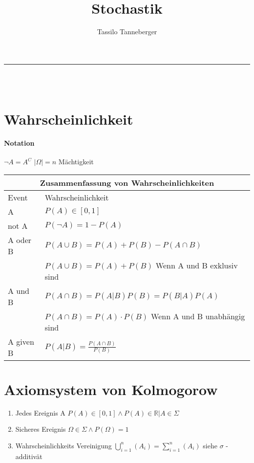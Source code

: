 \documentclass[12pt]{article}
\title{Stochastik}
\author{Tassilo Tanneberger}
\makeatletter
\newcommand{\linia}{\rule{\linewidth}{0.5pt}}
\renewcommand{\maketitle}{\begin{center}
\huge \@title\end{center}
\linia\\
{\large\@author\hfill\@date\\}}
\makeatother
\begin{document}
\maketitle

\section{Wahrscheinlichkeit}

\paragraph{Notation} \( \neg A = A^C \) \newline \( \vert \Omega \vert = n \) Mächtigkeit \newline

\begin{tabular}{ |p{5cm}|p{12cm}|  }
 \hline
 \multicolumn{2}{|c|}{Zusammenfassung von Wahrscheinlichkeiten} \\
 \hline
Event & Wahrscheinlichkeit\\
 \hline
 A & \( P(A) \in [0, 1] \) \\
 not A & \( P(\neg A) = 1 - P(A) \) \\
 A oder B & \( P(A \cup B) = P(A) + P(B) - P(A \cap B) \)  \\
  & \(  P(A \cup B) = P(A) + P(B) \) Wenn A und B exklusiv sind \\
 A und B & \( P(A \cap B) = P(A\vert B)P(B) = P(B\vert A)P(A)\) \\
 & \( P(A \cap B) = P(A) \cdot P(B) \) Wenn A und B unabhängig sind\\
  A given B & \( P(A \vert B) = \frac{P(A \cap B)}{P(B)}\) \\
 \hline
\end{tabular}

\section{ Axiomsystem von Kolmogorow}

\begin{enumerate}
	\item Jedes Ereignis A \( P(A) \in [0,1] \land P(A) \in \mathbb{R} \vert A \in \Sigma \) 
	\item Sicheres Ereignis \( \Omega \in \Sigma \land P(\Omega) = 1 \)
	\item Wahrscheinlichkeits Vereinigung \( \bigcup_{i=1}^{n} (A_i) = \sum_{i=1}^n (A_i)\) siehe \( \sigma \) - additivät
	
\end{enumerate}
\end{document}
